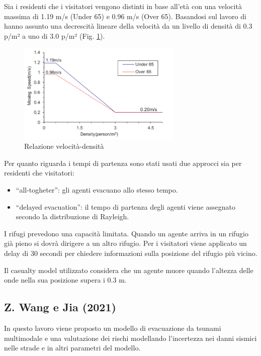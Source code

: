 Sia i residenti che i visitatori vengono distinti in base all'età con una velocità massima di 1.19 m/s (Under 65) e 0.96 m/s (Over 65).
Basandosi sul lavoro di \textcite{older1968movement} hanno assunto una decrescità lineare della 
velocità da un livello di densità di 0.3 p/m² a uno di 3.0 p/m² (Fig. \ref{fig:speed-linear}).

\begin{figure}[ht]
    \centering
    \includegraphics[width=0.7\textwidth]{images/speed_Linear.png}
    \caption{Relazione velocità-densità \textcite{takabatake2017simulated}}
    \label{fig:speed-linear}
\end{figure}

Per quanto riguarda i tempi di partenza sono stati usati due approcci sia per residenti che visitatori:
\begin{itemize}
    \item ``all-togheter'': gli agenti evacuano allo stesso tempo.
    \item ``delayed evacuation'': il tempo di partenza degli agenti viene assegnato secondo la distribuzione di Rayleigh.
\end{itemize}

I rifugi prevedono una capacità limitata. Quando un agente arriva in un rifugio già pieno si dovrà dirigere a un altro rifugio.
Per i visitatori viene applicato un delay di 30 secondi per chiedere informazioni sulla posizione del rifugio più vicino.

Il casualty model utilizzato considera che un agente muore quando l'altezza delle onde nella sua posizione supera i 0.3 m.


\subsection{Z. Wang e Jia (2021)}
In questo lavoro viene proposto un modello di evacuazione da tsunami multimodale e una valutazione dei rischi modellando l'incertezza
nei danni sismici nelle strade e in altri parametri del modello.

